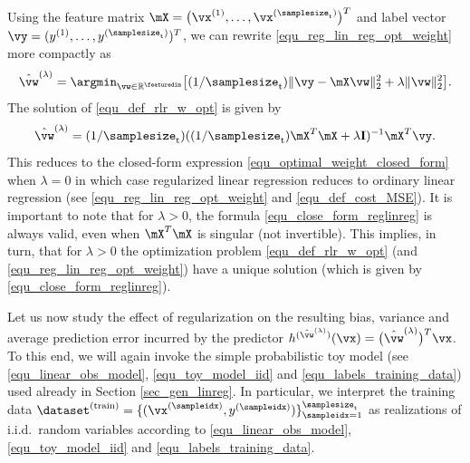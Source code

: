 \documentclass[12pt]{report}
\begin{document}
Using the feature matrix $\mX=\big(\vx^{(1)},\ldots,\vx^{(\samplesize_{\rm t})}\big)^{T}$ and label vector $\vy=(y^{(1)},\ldots,y^{(\samplesize_{\rm t})})^{T}$, 
we can rewrite \eqref{equ_reg_lin_reg_opt_weight} more compactly as 
\begin{equation} 
\label{equ_def_rlr_w_opt}
\hat{\vw}^{(\lambda)} = \argmin_{\vw \in \mathbb{R}^{\featuredim}} \big[ (1/\samplesize_{\rm t}) \| \vy - \mX \vw \|^{2}_{2} + \lambda \| \vw \|^{2}_{2}\big].
\end{equation} 
The solution of \eqref{equ_def_rlr_w_opt} is given by 
\begin{equation}
\label{equ_close_form_reglinreg}
\hat{\vw}^{(\lambda)} = (1/\samplesize_{\rm t}) ((1/\samplesize_{\rm t}) \mX^{T} \mX + \lambda \mathbf{I})^{-1} \mX^{T} \vy. 
\end{equation}
This reduces to the closed-form expression \eqref{equ_optimal_weight_closed_form} 
when $\lambda=0$ in which case regularized linear regression reduces to ordinary linear 
regression (see \eqref{equ_reg_lin_reg_opt_weight} and \eqref{equ_def_cost_MSE}). It 
is important to note that for $\lambda>0$, the formula \eqref{equ_close_form_reglinreg} 
is always valid, even when $\mX^{T} \mX$ is singular (not invertible). This implies, in turn, 
that for $\lambda> 0$ the optimization problem \eqref{equ_def_rlr_w_opt} (and \eqref{equ_reg_lin_reg_opt_weight}) 
have a unique solution (which is given by \eqref{equ_close_form_reglinreg}). 

Let us now study the effect of regularization on the resulting bias, variance and average 
prediction error incurred by the predictor $h^{(\hat{\vw}^{(\lambda)})}(\vx) = \big(\hat{\vw}^{(\lambda)}\big)^{T} \vx$. 
To this end, we will again invoke the simple probabilistic toy model (see \eqref{equ_linear_obs_model}, \eqref{equ_toy_model_iid} 
and \eqref{equ_labels_training_data}) used already in Section \ref{sec_gen_linreg}. In particular, we interpret 
the training data $\dataset^{(\rm train)} = \{ (\vx^{(\sampleidx)},y^{(\sampleidx)}) \}_{\sampleidx=1}^{\samplesize_{\rm t}}$ 
as realizations of i.i.d.\ random variables according to \eqref{equ_linear_obs_model}, \eqref{equ_toy_model_iid} and \eqref{equ_labels_training_data}. 
\end{document}
